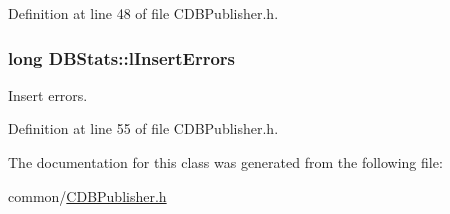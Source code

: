 \-Definition at line 48 of file \-C\-D\-B\-Publisher.\-h.

\hypertarget{class_d_b_stats_a07bd5ba687fa2c6a5049e0524310364d}{
\subsubsection[{l\-Insert\-Errors}]{\setlength{\rightskip}{0pt plus 5cm}long {\bf \-D\-B\-Stats\-::l\-Insert\-Errors}}}\label{class_d_b_stats_a07bd5ba687fa2c6a5049e0524310364d}


\-Insert errors. 



\-Definition at line 55 of file \-C\-D\-B\-Publisher.\-h.



\-The documentation for this class was generated from the following file\-:\begin{DoxyCompactItemize}
\item 
common/\hyperlink{_c_d_b_publisher_8h}{\-C\-D\-B\-Publisher.\-h}\end{DoxyCompactItemize}
